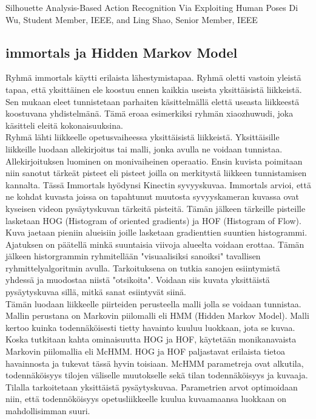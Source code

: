 Silhouette Analysis-Based Action Recognition Via
Exploiting Human Poses
Di Wu, Student Member, IEEE, and Ling Shao, Senior Member, IEEE


\subsection{immortals ja Hidden Markov Model}

Ryhmä immortals käytti erilaista lähestymistapaa. Ryhmä oletti vastoin yleistä tapaa,
että yksittäinen ele koostuu ennen kaikkia useista yksittäisistä liikkeistä. Sen mukaan eleet tunnistetaan parhaiten
käsittelmällä elettä useasta liikkeestä koostuvana yhdistelmänä. Tämä eroaa esimerkiksi ryhmän xiaozhuwudi, joka käsitteli
eleitä kokonaisuuksina.\\
Ryhmä lähti liikkeelle opetusvaiheessa yksittäisistä liikkeistä. Yksittäisille liikkeille luodaan allekirjoitus tai malli,
jonka avulla ne voidaan tunnistaa. Allekirjoituksen luominen on monivaiheinen operaatio. Ensin kuvista poimitaan niin sanotut
tärkeät pisteet eli pisteet joilla on merkitystä liikkeen tunnistamisen kannalta. Tässä Immortals hyödynsi Kinectin syvyyskuvaa.
Immortals arvioi, että ne kohdat kuvasta joissa on tapahtunut muutosta syvyyskameran kuvassa ovat kyseisen videon pysäytyskuvan
tärkeitä pisteitä. Tämän jälkeen tärkeille pisteille lasketaan HOG (Histogram of oriented gradients) ja HOF (Histogram of Flow). 
Kuva jaetaan pieniin alueisiin joille lasketaan gradienttien suuntien histogrammi. Ajatuksen on päätellä minkä suuntaisia 
viivoja alueelta voidaan erottaa. Tämän jälkeen historgrammin ryhmitellään "visuaalisiksi sanoiksi" tavallisen ryhmittelyalgoritmin avulla.
Tarkoituksena on tutkia sanojen esiintymistä yhdessä ja muodostaa niistä "otsikoita". Voidaan siis kuvata yksittäistä pysäytyskuvaa
sillä, mitkä sanat esiintyvät siinä.\\
Tämän luodaan liikkeelle piirteiden perusteella malli jolla se voidaan tunnistaa. Mallin perustana on Markovin piilomalli eli HMM (Hidden Markov Model).
Malli kertoo kuinka todennäköisesti tietty havainto kuuluu luokkaan, jota se kuvaa. Koska tutkitaan kahta ominaisuutta HOG ja HOF,
käytetään monikanavaista Markovin piilomallia eli McHMM. HOG ja HOF paljastavat erilaista tietoa havainnosta ja tukevat tässä hyvin toisiaan.
McHMM parametreja ovat alkutila, todennäköisyys tilojen väliselle muutokselle sekä tilan todennäköisyys ja kuvaaja. Tilalla tarkoitetaan
yksittäistä pysäytyskuvaa. Parametrien arvot optimoidaan niin, että todennököisyys opetusliikkeelle kuulua kuvaamaansa luokkaan on mahdollisimman suuri.


